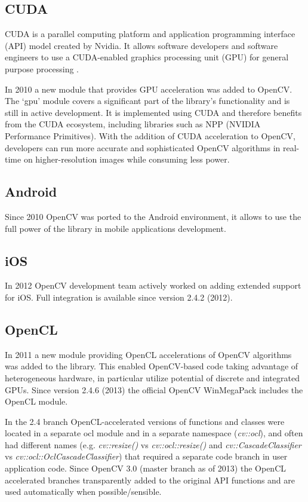 \documentclass[9pt,twocolumn,twoside]{styles/osajnl}
\begin{document}
\subsection{CUDA}

CUDA is a parallel computing platform and application programming interface (API) model created by Nvidia. It allows software developers and software engineers to use a CUDA-enabled graphics processing unit (GPU) for general purpose processing \cite{www-cuda-wiki}. 

In 2010 a new module that provides GPU acceleration was added to OpenCV. The ‘gpu’ module covers a significant part of the library’s functionality and is still in active development. It is implemented using CUDA and therefore benefits from the CUDA ecosystem, including libraries such as NPP (NVIDIA Performance Primitives). With the addition of CUDA acceleration to OpenCV, developers can run more accurate and sophisticated OpenCV algorithms in real-time on higher-resolution images while consuming less power.

\subsection{Android}
Since 2010 OpenCV was ported to the Android environment, it allows to use the full power of the library in mobile applications development.
\subsection{iOS}
In 2012 OpenCV development team actively worked on adding extended support for iOS. Full integration is available since version 2.4.2 (2012).

\subsection{OpenCL}
In 2011 a new module providing OpenCL accelerations of OpenCV algorithms was added to the library. This enabled OpenCV-based code taking advantage of heterogeneous hardware, in particular utilize potential of discrete and integrated GPUs. Since version 2.4.6 (2013) the official OpenCV WinMegaPack includes the OpenCL module.

In the 2.4 branch OpenCL-accelerated versions of functions and classes were located in a separate ocl module and in a separate namespace (\textit{cv::ocl}), and often had different names (e.g. \textit{cv::resize()} vs \textit{cv::ocl::resize()} and \textit{cv::CascadeClassifier} vs \textit{cv::ocl::OclCascadeClassifier}) that required a separate code branch in user application code. Since OpenCV 3.0 (master branch as of 2013) the OpenCL accelerated branches transparently added to the original API functions and are used automatically when possible/sensible.
\end{document}
